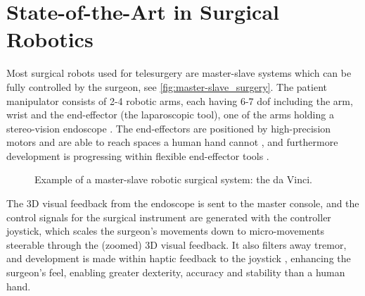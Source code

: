 






\section{State-of-the-Art in Surgical Robotics}
Most surgical robots used for telesurgery are master-slave systems which can be fully controlled by the surgeon, see \autoref{fig:master-slave_surgery}. %
The patient manipulator consists of 2-4 robotic arms, each having 6-7 \gls{dof} %
including the arm, wrist and the end-effector (the laparoscopic tool), one of the arms holding a stereo-vision \gls{endoscope} \citep{bib:raven_debride}. 
The end-effectors are positioned by high-precision motors and are able to reach spaces a human hand cannot \citep{bib:docatadist}, and furthermore development is progressing within flexible end-effector tools \citep[p 74]{bib:surgical_book}. %

\begin{figure}[htbp]
\hspace*{-5mm}
%
%
\caption{Example of a master-slave robotic surgical system: the da Vinci.}
\label{fig:master-slave_surgery}
\end{figure}

The 3D visual feedback from the endoscope is sent to the master console, %
and the control signals for the surgical instrument are generated with the controller joystick, which scales the surgeon's movements down to micro-movements \citep{bib:intuitive_monopoly} steerable through the (zoomed) 3D visual feedback. It also filters away tremor, and development is made within haptic feedback to the joystick \citep[p 89]{bib:surgical_book}, enhancing the surgeon's feel, enabling greater dexterity, accuracy and stability than a human hand.

